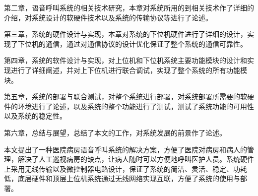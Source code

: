 第二章，语音呼叫系统的相关技术研究，本章对系统所用的到相关技术作了详细的介绍，对系统设计的软硬件技术以及系统的传输协议等进行了论述。

第三章，系统的硬件设计与实现，本章对系统的下位机硬件进行了详细的设计，实现了下位机的通信，通过对通信协议的设计优化保证了整个系统的通信可靠性。

第四章，系统的软件设计与实现，对上位机和下位机系统主要功能模块的设计和实现进行了详细阐述，并对上下位机进行联合调试，实现了整个系统的所有功能模块。

第五章，系统的部署与联合测试，对整个系统进行部署，对系统部署所需要的软硬件的环境进行了论述，以及系统的整个功能进行了测试，测试了系统功能的可用性以及系统的稳定性。

第六章，总结与展望，总结了本文的工作，对系统发展的前景作了论述。

本文提出了一种医院病房语音呼叫系统的解决方案，方便了医院对病房和病人的管理，解决了人工巡视病房的缺点，让病人随时可以方便地呼叫医护人员。系统硬件上采用无线传输以及微控制器电路设计，保证了系统的简洁、灵活、稳定、功耗低，底层硬件和顶层上位机系统通过无线网络实现互联，方便了系统的使用与部署。
